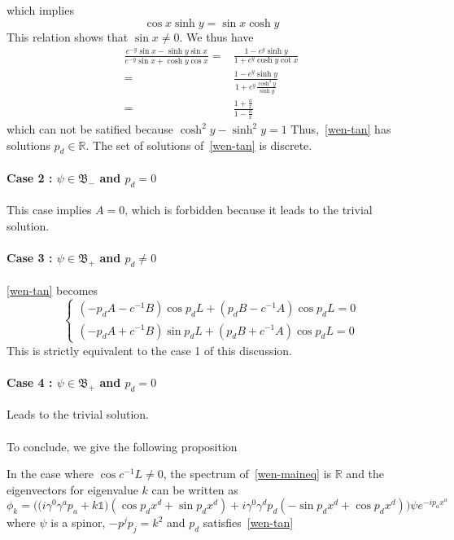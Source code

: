 which implies
\begin{equation*}
\cos x \sinh y = \sin x \cosh y
\end{equation*}
This relation shows that $\sin x \neq 0$.
We thus have
\begin{equation*}\begin{split}
\frac{e^{-y}\sin x - \sinh y \sin x}{e^{-y}\sin x + \cosh y \cos x} = &
\frac{1 - e^y \sinh y}{1+ e^y \cosh y \cot x} \\
= &\frac{1 - e^y \sinh y }{1+ e^y \frac{\cosh^2 y }{\sinh y}} \\
=& \frac{1+\frac{a}{x}}{1 - \frac{a}{x}}
\end{split}
\end{equation*}
which can not be satified because $\cosh^2 y - \sinh^2 y =1$
Thus,~\cref{wen-tan} has solutions $p_d \in \mathbb{R}$. The set of solutions of~\cref{wen-tan} is discrete.
\paragraph{Case 2 : $\psi \in \mathfrak{B}_-$ and $p_d = 0$}
This case implies $A = 0$, which is forbidden because it leads to the trivial solution.
%
\paragraph{Case 3 : $\psi \in \mathfrak{B}_+$ and $p_d \neq 0$}
\cref{wen-tan} becomes
\begin{equation*}
\begin{cases}
(-p_d A - c^{-1} B)\cos p_d L + (p_d B - c^{-1}A)\cos p_d L = 0  \\
(-p_d A + c^{-1}B)\sin p_d L + (p_d B + c^{-1} A)\cos p_d L = 0 
\end{cases}
\end{equation*}
This is strictly equivalent to the case 1 of this discussion.
%
\paragraph{Case 4 : $\psi \in \mathfrak{B}_+$ and $p_d = 0$}
Leads to the trivial solution. \\\\
To conclude, we give the following proposition
\begin{proposition}
In the case where $\cos c^{-1}L \neq 0$,
the spectrum of~\cref{wen-maineq} is $\mathbb{R}$ 
and the eigenvectors for eigenvalue $k$ can be written as 
\begin{equation*}
\phi_k = \Big(\big(i\gamma^0\gamma^a p_a+k\mathbb{1}\big)(\cos p_d x^d + \sin p_d x^d) +
i\gamma^0\gamma^d p_d(-\sin p_d x^d + \cos p_d x^d)\Big) \psi e^{-ip_a x^a}
\end{equation*}
where $\psi$ is a spinor, $-p^jp_j = k^2$ and $p_d$ satisfies~\cref{wen-tan}
\end{proposition}




